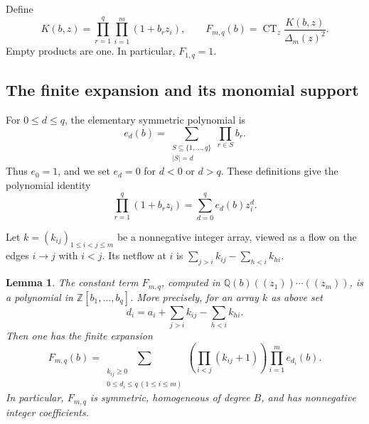 \documentclass[reqno, 12pt]{article}
\numberwithin{equation}{section}
\newtheorem{lemma}[theorem]{Lemma}
\theoremstyle{definition}
\DeclareMathOperator{\CT}{CT}
\begin{document}
Define
\begin{equation}\label{ct:universal-definition}
 K(b,z)=\prod_{r=1}^{q}\prod_{i=1}^{m}(1+b_rz_i),\qquad
 F_{m,q}(b)=\CT_z\frac{K(b,z)}{\Delta_m(z)^2}.
\end{equation}
Empty products are one.  In particular, $F_{1,q}=1$.

\subsection{The finite expansion and its monomial support}

For $0\leq d\leq q$, the elementary symmetric polynomial is
\[
 e_d(b)=\sum_{\substack{S\subseteq\{1,\ldots,q\}\\|S|=d}}
          \prod_{r\in S}b_r.
\]
Thus $e_0=1$, and we set $e_d=0$ for $d<0$ or $d>q$.
These definitions give the polynomial identity
\[
 \prod_{r=1}^q(1+b_rz_i)=\sum_{d=0}^q e_d(b)z_i^d.
\]

Let $k=(k_{ij})_{1\leq i<j\leq m}$ be a nonnegative integer
array, viewed as a flow on the edges $i\to j$ with $i<j$.
Its netflow at $i$ is
$\sum_{j>i}k_{ij}-\sum_{h<i}k_{hi}$.

\begin{lemma}\label{ct:finite-expansion}
The constant term $F_{m,q}$, computed in
$\mathbb Q(b)((z_1))\cdots((z_m))$, is a polynomial in
$\mathbb Z[b_1,\ldots,b_q]$.  More precisely, for an array $k$
as above set
\begin{equation}\label{ct:degree-vector}
 d_i=a_i+\sum_{j>i}k_{ij}-\sum_{h<i}k_{hi}.
\end{equation}
Then one has the finite expansion
\begin{equation}\label{ct:finite-formula}
 F_{m,q}(b)=
 \sum_{\substack{k_{ij}\geq0\\0\leq d_i\leq q\ (1\leq i\leq m)}}
 \left(\prod_{i<j}(k_{ij}+1)\right)\prod_{i=1}^m e_{d_i}(b).
\end{equation}
In particular, $F_{m,q}$ is symmetric, homogeneous of degree $B$,
and has nonnegative integer coefficients.
\end{lemma}
\end{document}
